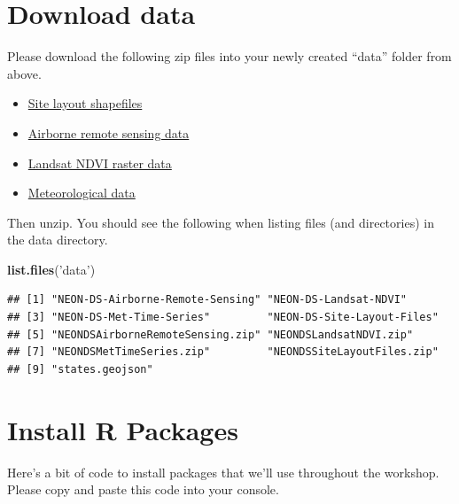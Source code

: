 \documentclass[]{book}
\newenvironment{Shaded}{\begin{snugshade}}{\end{snugshade}}
\newcommand{\KeywordTok}[1]{\textcolor[rgb]{0.13,0.29,0.53}{\textbf{{#1}}}}
\newcommand{\StringTok}[1]{\textcolor[rgb]{0.31,0.60,0.02}{{#1}}}
\newcommand{\NormalTok}[1]{{#1}}
\providecommand{\tightlist}{%
  \setlength{\itemsep}{0pt}\setlength{\parskip}{0pt}}
\theoremstyle{definition}
\theoremstyle{definition}
\theoremstyle{definition}
\theoremstyle{remark}
\begin{document}
\section{Download data}\label{download-data}

Please download the following zip files into your newly created ``data''
folder from above.

\begin{itemize}
\tightlist
\item
  \href{https://ndownloader.figshare.com/files/3708751}{Site layout
  shapefiles}
\item
  \href{https://ndownloader.figshare.com/files/3701578}{Airborne remote
  sensing data}
\item
  \href{https://ndownloader.figshare.com/files/4933582}{Landsat NDVI
  raster data}
\item
  \href{https://ndownloader.figshare.com/files/3701572}{Meteorological
  data}
\end{itemize}

Then unzip. You should see the following when listing files (and
directories) in the data directory.

\begin{Shaded}
\begin{Highlighting}[]
\KeywordTok{list.files}\NormalTok{(}\StringTok{'data'}\NormalTok{)}
\end{Highlighting}
\end{Shaded}

\begin{verbatim}
## [1] "NEON-DS-Airborne-Remote-Sensing" "NEON-DS-Landsat-NDVI"           
## [3] "NEON-DS-Met-Time-Series"         "NEON-DS-Site-Layout-Files"      
## [5] "NEONDSAirborneRemoteSensing.zip" "NEONDSLandsatNDVI.zip"          
## [7] "NEONDSMetTimeSeries.zip"         "NEONDSSiteLayoutFiles.zip"      
## [9] "states.geojson"
\end{verbatim}

\section{Install R Packages}\label{install-r-packages}

Here's a bit of code to install packages that we'll use throughout the
workshop. Please copy and paste this code into your console.
\end{document}
